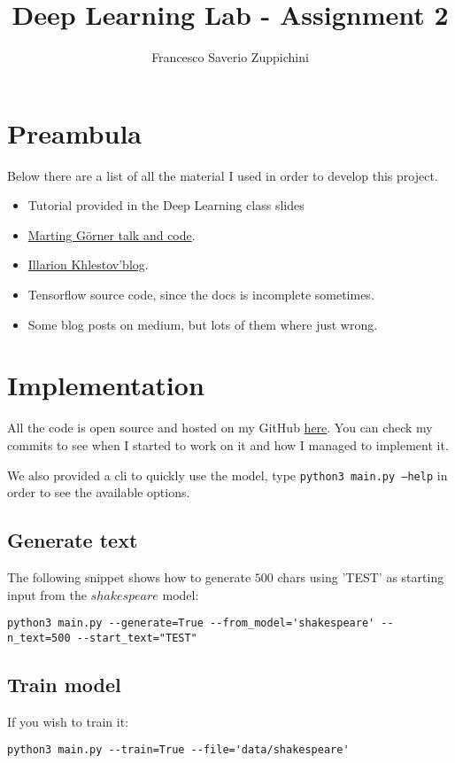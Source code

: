 \documentclass[11pt]{article}
\title{Deep Learning Lab - Assignment 2}
\author{Francesco Saverio Zuppichini}
\begin{document}
\maketitle
\section{Preambula}
Below there are a list of all the material I used in order to develop this project. 
\begin{itemize}
	\item Tutorial provided in the Deep Learning class slides
	\item \href{https://www.youtube.com/watch?v=vq2nnJ4g6N0}{Marting Görner talk and code}.
	\item \href{https://ikhlestov.github.io/pages/machine-learning/tensorflow-hints/}{Illarion Khlestov'blog}.
	\item Tensorflow source code, since the docs is incomplete sometimes.
	\item Some blog posts on medium, but lots of them where just wrong. 
 \end{itemize}
\section{Implementation}
All the code is open source and hosted on my GitHub \href{https://github.com/FrancescoSaverioZuppichini/LSTM-Text-Generator}{here}. You can check my commits to see when I started to work on it and how I managed to implement it.

We also provided a cli to quickly use the model, type \texttt{python3 main.py --help} in order to see the available options.
\subsection{Generate text}
The following snippet shows how to generate $500$ chars using 'TEST' as starting input from the $shakespeare$ model:
\begin{lstlisting}[breaklines=true]
python3 main.py --generate=True --from_model='shakespeare' --n_text=500 --start_text="TEST"	
\end{lstlisting}
\subsection{Train model}
If you wish to train it:
\begin{lstlisting}[breaklines=true]
python3 main.py --train=True --file='data/shakespeare'	
\end{lstlisting}
\end{document}
